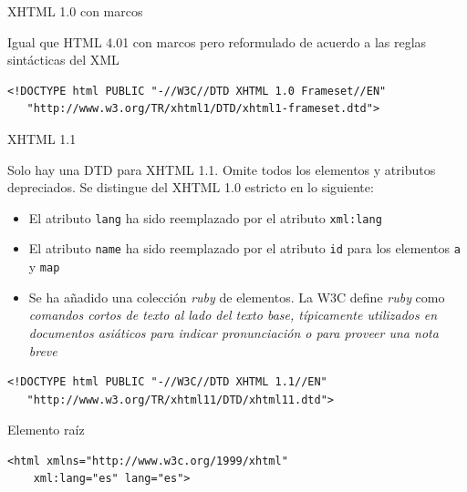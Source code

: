 \documentclass{beamer}
\begin{document}
\begin{frame}[fragile]{XHTML 1.0 con marcos} %
    \begin{center}
        Igual que HTML 4.01 con marcos pero reformulado de acuerdo a las reglas
        sintácticas del XML
    \end{center}
    \begin{lstlisting}
<!DOCTYPE html PUBLIC "-//W3C//DTD XHTML 1.0 Frameset//EN"
   "http://www.w3.org/TR/xhtml1/DTD/xhtml1-frameset.dtd">
    \end{lstlisting} 
\end{frame}


\begin{frame}[fragile]{XHTML 1.1} %
    \begin{center}
        Solo hay una DTD para XHTML 1.1. Omite todos los elementos y atributos
        depreciados. Se distingue del XHTML 1.0 estricto en lo siguiente: 

        \begin{itemize}
            \item El atributo \texttt{lang} ha sido reemplazado por el atributo
            \texttt{xml:lang}
            \item El atributo \texttt{name} ha sido reemplazado por el atributo
            \texttt{id} para los elementos \texttt{a} y \texttt{map}
            \item Se ha añadido una colección \textit{ruby} de elementos. La
            W3C define \textit{ruby} como \textit{comandos cortos de texto al
            lado del texto base, típicamente utilizados en documentos
            asiáticos para indicar pronunciación o para proveer una nota breve}
        \end{itemize}
    \end{center}
    \begin{lstlisting}
<!DOCTYPE html PUBLIC "-//W3C//DTD XHTML 1.1//EN" 
   "http://www.w3.org/TR/xhtml11/DTD/xhtml11.dtd">
    \end{lstlisting} 
\end{frame}

\begin{frame}[fragile]{Elemento raíz} %
    \begin{center}
        \begin{lstlisting}
<html xmlns="http://www.w3c.org/1999/xhtml" 
    xml:lang="es" lang="es"> 
        \end{lstlisting}
    \end{center}
\end{frame}
\end{document}

